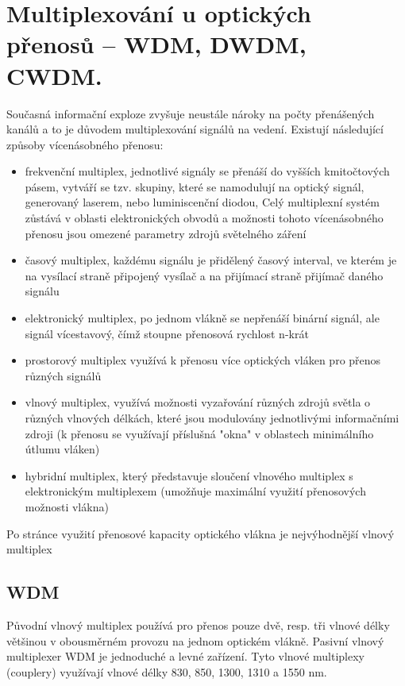 \section{Multiplexování u optických přenosů – WDM, DWDM, CWDM.}
Současná informační exploze zvyšuje neustále nároky na počty přenášených kanálů a to je důvodem multiplexování signálů na vedení. Existují následující způsoby vícenásobného přenosu:
\begin{itemize}
    \item frekvenční multiplex, jednotlivé signály se přenáší do vyšších kmitočtových pásem, vytváří se tzv. skupiny, které se namodulují na optický signál, generovaný laserem, nebo luminiscenční diodou, Celý multiplexní systém zůstává v oblasti elektronických obvodů a možnosti tohoto vícenásobného přenosu jsou omezené parametry zdrojů světelného záření
    \item časový multiplex, každému signálu je přidělený časový interval, ve kterém je na vysílací straně připojený vysílač a na přijímací straně přijímač daného signálu
    \item elektronický multiplex, po jednom vlákně se nepřenáší binární signál, ale signál vícestavový, čímž stoupne přenosová rychlost n-krát
    \item prostorový multiplex využívá k přenosu více optických vláken pro přenos různých signálů
    \item vlnový multiplex, využívá možnosti vyzařování různých zdrojů světla o různých vlnových délkách, které jsou modulovány jednotlivými informačními zdroji (k přenosu se využívají příslušná "okna" v oblastech minimálního útlumu vláken)
    \item hybridní multiplex, který představuje sloučení vlnového multiplex s elektronickým multiplexem (umožňuje maximální využití přenosových možnosti vlákna)
\end{itemize}
Po stránce využití přenosové kapacity optického vlákna je
nejvýhodnější vlnový multiplex

\subsection{WDM}
Původní vlnový multiplex používá pro přenos pouze dvě, resp. tři vlnové délky většinou v obousměrném provozu na jednom optickém vlákně. Pasivní vlnový multiplexer WDM je jednoduché a levné zařízení. Tyto vlnové multiplexy (couplery) využívají vlnové délky 830, 850, 1300, 1310 a 1550 nm.

